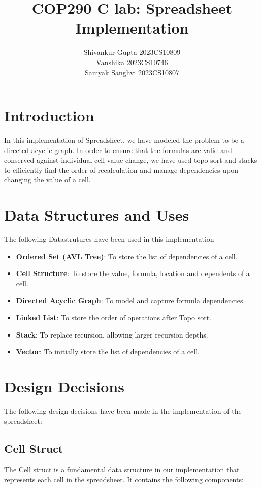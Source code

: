 \documentclass[10pt,a4paper]{article}  %
\title{COP290 C lab: Spreadsheet Implementation}
\author{Shivankur Gupta 2023CS10809\\ Vanshika 2023CS10746\\ Samyak Sanghvi 2023CS10807}
\begin{document}
\maketitle



\tableofcontents

\section{Introduction}
In this implementation of Spreadsheet, we have modeled the problem to be a directed acyclic graph. In order to ensure that the formulas are valid and conserved against individual cell value change, we have used topo sort and stacks to efficiently find the order of recalculation and manage dependencies upon changing the value of a cell.

\section{Data Structures and Uses}
The following Datastrutures have been used in this implementation

\begin{itemize}
    \item \textbf{Ordered Set (AVL Tree)}: To store the list of dependencies of a cell.
    \item \textbf{Cell Structure}: To store the value, formula, location and dependents of a cell.
    \item \textbf{Directed Acyclic Graph}: To model and capture formula dependencies.
    \item \textbf{Linked List}: To store the order of operations after Topo sort.
    \item \textbf{Stack}: To replace recursion, allowing larger recursion depths.
    \item \textbf{Vector}: To initially store the list of dependencies of a cell.
\end{itemize}



\section{Design Decisions}
The following design decisions have been made in the implementation of the spreadsheet:
\subsection{Cell Struct}
The Cell struct is a fundamental data structure in our implementation that represents each cell in the spreadsheet. It contains the following components:
\end{document}
